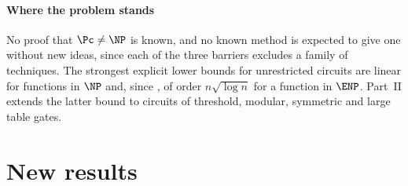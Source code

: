 \subsection{Where the problem stands}
No proof that $\Pc\ne\NP$ is known, and no known method is expected to give
one without new ideas, since each of the three barriers excludes a family of
techniques. The strongest explicit lower bounds for unrestricted circuits are
linear for functions in $\NP$ and, since \cite{OAI26}, of order $n\sqrt{\log
n}$ for a function in $\ENP$. Part~II extends the latter bound to circuits of
threshold, modular, symmetric and large table gates.

\part{New results}
